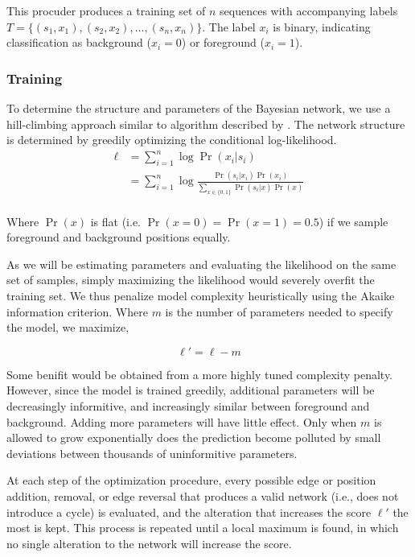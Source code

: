 \documentclass{bioinfo}
\begin{document}
This procuder produces a training set of $n$ sequences with accompanying labels
$T = \{ (s_1, x_1), (s_2, x_2), \dots, (s_n, x_n) \}$. The label $x_i$ is
binary, indicating classification as background ($x_i = 0$) or foreground ($x_i
= 1$).

\subsubsection{Training}


To determine the structure and parameters of the Bayesian network, we use a
hill-climbing approach similar to algorithm described by \citet{Grossman2004}.
The network structure is determined by greedily optimizing the conditional
log-likelihood.
\begin{align*}
\ell &= \sum_{i=1}^{n} \log \Pr( x_i | s_i ) \\
&=
\sum_{i=1}^{n} \log \frac{ \Pr(s_i | x_i) \Pr( x_i ) }{
\sum_{x \in \{0,1\}} \Pr( s_i | x ) \Pr(x) } \\
\end{align*}

Where $\Pr(x)$ is flat (i.e.  $\Pr( x = 0 ) = \Pr( x = 1 ) =
0.5$) if we sample foreground and background positions equally.

As we will be estimating parameters and evaluating the likelihood on the same
set of samples, simply maximizing the likelihood would severely overfit the
training set. We thus penalize model complexity heuristically using the Akaike
information criterion. Where $m$ is the number of parameters needed to specify
the model, we maximize, 

$$ \ell' = \ell - m $$

Some benifit would be obtained from a more highly tuned complexity penalty.
However, since the model is trained greedily, additional parameters will be
decreasingly informitive, and increasingly similar between foreground and
background. Adding more parameters will have little effect.  Only when $m$ is
allowed to grow exponentially does the prediction become polluted by small
deviations between thousands of uninformitive parameters.

At each step of the optimization procedure, every possible edge or position
addition, removal, or edge reversal that produces a valid network (i.e., does not
introduce a cycle) is evaluated, and the alteration that increases the score
$\ell'$ the most is kept.  This process is repeated until a local maximum is
found, in which no single alteration to the network will increase the score.
\end{document}

